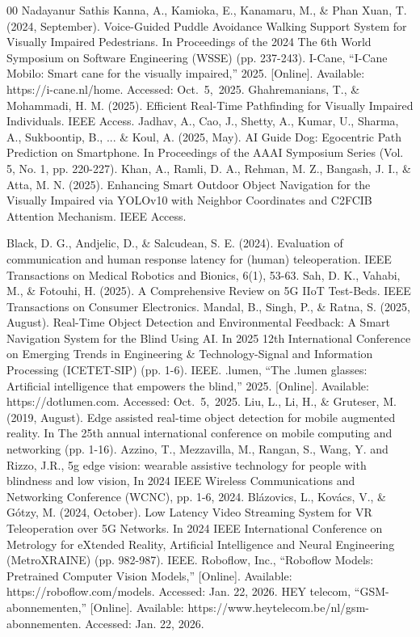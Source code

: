 \documentclass{ieeeaccess}
\begin{document}
\begin{thebibliography}{00}
Nadayanur Sathis Kanna, A., Kamioka, E., Kanamaru, M., \& Phan Xuan, T. (2024, September). Voice-Guided Puddle Avoidance Walking Support System for Visually Impaired Pedestrians. In Proceedings of the 2024 The 6th World Symposium on Software Engineering (WSSE) (pp. 237-243).
I-Cane,
``I-Cane Mobilo: Smart cane for the visually impaired,'' 2025. [Online]. Available: https://i-cane.nl/home. Accessed: Oct.~5,~2025.
Ghahremanians, T., \& Mohammadi, H. M. (2025). Efficient Real-Time Pathfinding for Visually Impaired Individuals. IEEE Access.
Jadhav, A., Cao, J., Shetty, A., Kumar, U., Sharma, A., Sukboontip, B., ... \& Koul, A. (2025, May). AI Guide Dog: Egocentric Path Prediction on Smartphone. In Proceedings of the AAAI Symposium Series (Vol. 5, No. 1, pp. 220-227).
Khan, A., Ramli, D. A., Rehman, M. Z., Bangash, J. I., \& Atta, M. N. (2025). Enhancing Smart Outdoor Object Navigation for the Visually Impaired via YOLOv10 with Neighbor Coordinates and C2FCIB Attention Mechanism. IEEE Access.

Black, D. G., Andjelic, D., \& Salcudean, S. E. (2024). Evaluation of communication and human response latency for (human) teleoperation. IEEE Transactions on Medical Robotics and Bionics, 6(1), 53-63.
Sah, D. K., Vahabi, M., \& Fotouhi, H. (2025). A Comprehensive Review on 5G IIoT Test-Beds. IEEE Transactions on Consumer Electronics.
Mandal, B., Singh, P., \& Ratna, S. (2025, August). Real-Time Object Detection and Environmental Feedback: A Smart Navigation System for the Blind Using AI. In 2025 12th International Conference on Emerging Trends in Engineering \& Technology-Signal and Information Processing (ICETET-SIP) (pp. 1-6). IEEE.
.lumen,
``The .lumen glasses: Artificial intelligence that empowers the blind,'' 2025. [Online]. Available: https://dotlumen.com. Accessed: Oct.~5,~2025.
Liu, L., Li, H., \& Gruteser, M. (2019, August). Edge assisted real-time object detection for mobile augmented reality. In The 25th annual international conference on mobile computing and networking (pp. 1-16).
Azzino, T., Mezzavilla, M., Rangan, S., Wang, Y. and Rizzo, J.R., 5g edge vision: wearable assistive technology for people with blindness and low vision, In 2024 IEEE Wireless Communications and Networking Conference (WCNC), pp. 1-6, 2024.
Blázovics, L., Kovács, V., \& Gótzy, M. (2024, October). Low Latency Video Streaming System for VR Teleoperation over 5G Networks. In 2024 IEEE International Conference on Metrology for eXtended Reality, Artificial Intelligence and Neural Engineering (MetroXRAINE) (pp. 982-987). IEEE.
Roboflow, Inc., ``Roboflow Models: Pretrained Computer Vision Models,'' [Online].
Available: https://roboflow.com/models. Accessed: Jan. 22, 2026.
HEY telecom, ``GSM-abonnementen,'' [Online].
Available: https://www.heytelecom.be/nl/gsm-abonnementen. Accessed: Jan. 22, 2026.
\end{thebibliography}
\end{document}
